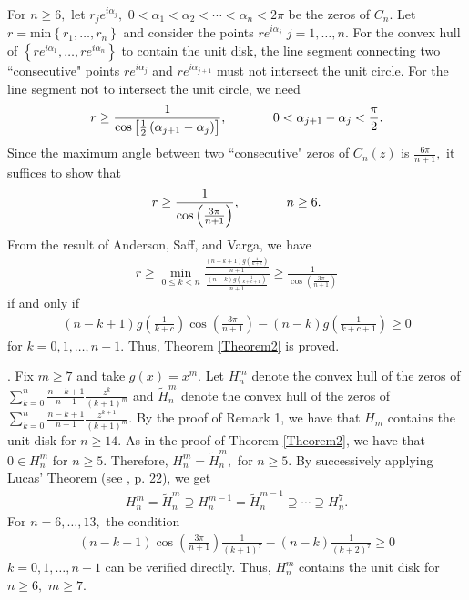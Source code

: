 \documentclass[final]{siamltex}
\begin{document}
  For $n \geq 6,$ let $r_{j}e^{i \alpha_{j}},$ $0 < \alpha_{1} < \alpha_{2} < \cdots < \alpha_{n} < 2 \pi$ be the zeros of $C_{n}.$ Let $r = \mbox{min} \left\{ r_{1}, \ldots, r_{n} \right\}$ and consider the points $re^{i \alpha_{j}}$ $j = 1, \ldots, n.$ For the convex hull of $\left\{ re^{i \alpha_{1}}, \ldots, re^{i \alpha_{n}} \right\}$ to contain the unit disk, the line segment connecting two ``consecutive" points $re^{i \alpha_{j}}$ and $re^{i \alpha_{j+1}}$ must not intersect the unit circle. For the line segment not to intersect the unit circle, we need 
 \begin{eqnarray*} r \geq \frac{1}{ \cos \left[ \frac{1}{2} \left( \alpha_{j+1} - \alpha_{j} \right) \right] }, \hspace{.5in} 0 < \alpha_{j+1} - \alpha_{j} < \frac{\pi}{2}. 
 \end{eqnarray*}
  Since the maximum angle between two ``consecutive" zeros of $C_{n}(z)$ is $\frac{ 6 \pi}{n+1},$ it suffices to show that 
 \begin{eqnarray*} r \geq \frac{1}{ \cos \left( \frac{3 \pi}{n+1} \right) }, \hspace{.5 in} n \geq 6.
 \end{eqnarray*}
 From the result of Anderson, Saff, and Varga, we have 
 \begin{eqnarray*} r \geq \min_{0 \leq k < n} \frac{  \frac{ (n-k+1)g \left( \frac{1}{k+c} \right) }{n+1} }{ \frac{ (n-k) g \left( \frac{1}{k+c+1} \right) }{n+1} } \geq \frac{1}{ \cos \left( \frac{3 \pi}{n+1} \right) }
 \end{eqnarray*}
  if and only if 
  \begin{eqnarray}
\label{l3.5}
(n-k+1)g \left( \frac{1}{k+c} \right) \cos \left( \frac{3 \pi}{n+1} \right) - (n-k)g \left( \frac{1}{k+c+1} \right) \geq 0 
  \end{eqnarray}
  for $ k = 0, 1, \ldots, n-1.$ Thus, Theorem \ref{Theorem2} is proved. 

\vspace {4 pt}


.  Fix $m \geq 7$ and take $g(x) = x^{m}.$ Let $H_{n}^{m}$ denote the convex hull of the zeros of $\sum_{k=0}^{n} \frac{n-k+1}{n+1} \frac{z^{k}}{(k+1)^{m}}$ and $\tilde{H}_{n}^{m}$ denote the convex hull of the zeros of $\sum_{k=0}^{n} \frac{n-k+1}{n+1} \frac{z^{k+1}}{(k+1)^{m}}.$ By the proof of Remark 1, we have that $H_{m}$ contains the unit disk for $n \geq 14.$ As in the proof of Theorem \ref{Theorem2}, we have that $0 \in H_{n}^{m}$ for $n \geq 5.$ Therefore, $H_{n}^{m} = \tilde{H}_{n}^{m},$ for $n \geq 5.$ By successively applying Lucas' Theorem (see \cite{mar}, p. 22), we get 
 \begin{eqnarray*}
  H_{n}^{m} = \tilde{H}_{n}^{m} \supseteq H_{n}^{m-1} = \tilde{H}_{n}^{m-1} \supseteq \cdots \supseteq H_{n}^{7}.
  \end{eqnarray*}
 For $n = 6, \ldots, 13,$ the condition
 \begin{eqnarray}
\label{c1.1}  
  (n-k+1)\cos \left( \frac{3\pi}{n+1} \right) \frac{1}{(k+1)^{7}} - (n-k) \frac{1}{(k+2)^{7}} \geq 0 
  \end{eqnarray}
 $k = 0,1,\ldots,n-1$ can be verified directly. Thus, $H_{n}^{m}$ contains the unit disk for $n \geq 6,$ $m \geq 7.$
\end{document}
